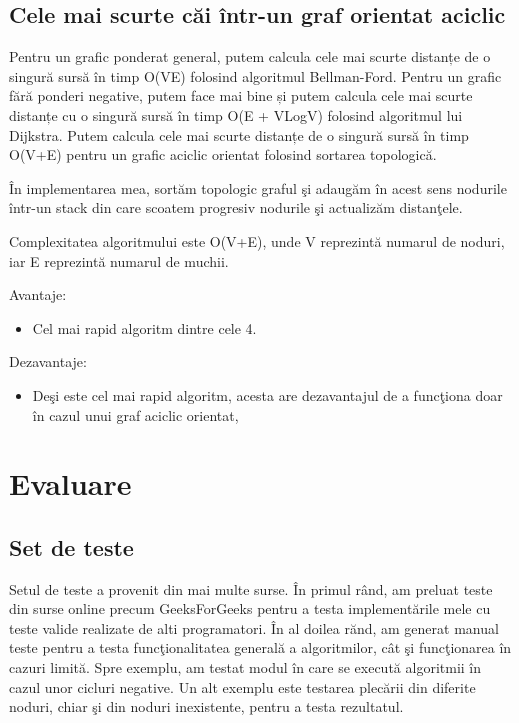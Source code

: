 \documentclass[runningheads]{llncs}
\begin{document}
\subsection{Cele mai scurte c\u{a}i \^{i}ntr-un graf orientat aciclic}
\hspace{20px }Pentru un grafic ponderat general, putem calcula cele mai scurte distanțe de o singură sursă în timp O(VE) folosind algoritmul Bellman-Ford. Pentru un grafic fără ponderi negative, putem face mai bine și putem calcula cele mai scurte distanțe cu o singură sursă în timp O(E + VLogV) folosind algoritmul lui Dijkstra. Putem calcula cele mai scurte distanțe de o singură sursă în timp O(V+E) pentru un grafic aciclic orientat folosind sortarea topologic\u{a}.

\^{I}n implementarea mea, sort\u{a}m topologic graful \c{s}i adaug\u{a}m \^{i}n acest sens nodurile \^{i}ntr-un stack din care scoatem progresiv nodurile \c{s}i actualiz\u{a}m distan\c{t}ele.

Complexitatea algoritmului este O(V+E), unde V reprezint\u{a} numarul de noduri, iar E reprezint\u{a} numarul de muchii.

Avantaje:
\begin{itemize}
	\item Cel mai rapid algoritm dintre cele 4.
\end{itemize}

Dezavantaje:
\begin{itemize}
	\item De\c{s}i este cel mai rapid algoritm, acesta are dezavantajul de a func\c{t}iona doar \^{i}n cazul unui graf aciclic orientat,
\end{itemize}

\newpage
\section{Evaluare}
\subsection{Set de teste}
Setul de teste a provenit din mai multe surse.
\^{I}n primul r\^{a}nd, am preluat teste din surse online precum GeeksForGeeks pentru a testa implement\u{a}rile mele cu teste valide realizate de alti programatori.
\^{I}n al doilea r\u{a}nd, am generat manual teste pentru a testa func\c{t}ionalitatea general\u{a} a algoritmilor, c\^{a}t \c{s}i func\c{t}ionarea \^{i}n cazuri limit\u{a}. Spre exemplu, am testat modul \^{i}n care se execut\u{a} algoritmii \^{i}n cazul unor cicluri negative. Un alt exemplu este testarea plec\u{a}rii din diferite noduri, chiar \c{s}i din noduri inexistente, pentru a testa rezultatul.
\end{document}

